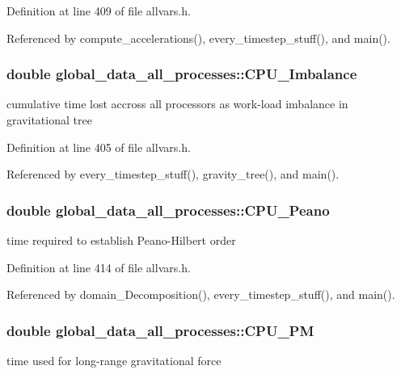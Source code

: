 Definition at line 409 of file allvars.h.



Referenced by compute\_\-accelerations(), every\_\-timestep\_\-stuff(), and main().

\hypertarget{structglobal__data__all__processes_a94e4eed16c5b353ec3c3c9ce380ec96a}{
\subsubsection[{CPU\_\-Imbalance}]{\setlength{\rightskip}{0pt plus 5cm}double {\bf global\_\-data\_\-all\_\-processes::CPU\_\-Imbalance}}}
\label{structglobal__data__all__processes_a94e4eed16c5b353ec3c3c9ce380ec96a}
cumulative time lost accross all processors as work-\/load imbalance in gravitational tree 

Definition at line 405 of file allvars.h.



Referenced by every\_\-timestep\_\-stuff(), gravity\_\-tree(), and main().

\hypertarget{structglobal__data__all__processes_a3d1492ec738b3ebf2025de1d2f398b7d}{
\subsubsection[{CPU\_\-Peano}]{\setlength{\rightskip}{0pt plus 5cm}double {\bf global\_\-data\_\-all\_\-processes::CPU\_\-Peano}}}
\label{structglobal__data__all__processes_a3d1492ec738b3ebf2025de1d2f398b7d}
time required to establish Peano-\/Hilbert order 

Definition at line 414 of file allvars.h.



Referenced by domain\_\-Decomposition(), every\_\-timestep\_\-stuff(), and main().

\hypertarget{structglobal__data__all__processes_a2251bf94479cb20a7af9c34ed56587d1}{
\subsubsection[{CPU\_\-PM}]{\setlength{\rightskip}{0pt plus 5cm}double {\bf global\_\-data\_\-all\_\-processes::CPU\_\-PM}}}
\label{structglobal__data__all__processes_a2251bf94479cb20a7af9c34ed56587d1}
time used for long-\/range gravitational force 

